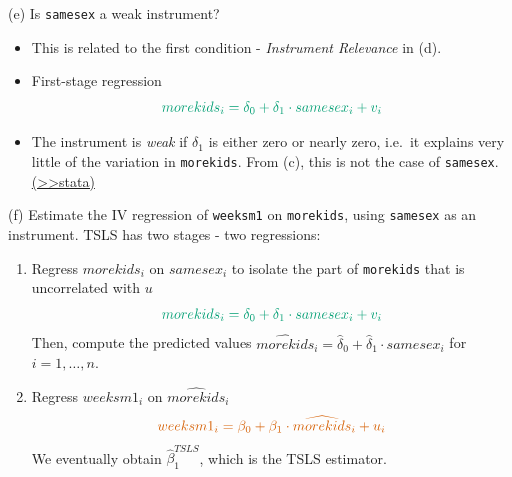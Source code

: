 \documentclass[
  10pt,
  ignorenonframetext,
]{beamer}
\begin{document}
\begin{frame}[fragile]{(e) Is \texttt{samesex} a weak instrument?}
\protect\hypertarget{e-is-samesex-a-weak-instrument}{}
\begin{itemize}
\item
  This is related to the first condition - \emph{Instrument Relevance}
  in (d).
\item
  First-stage regression \[
  \color{green}{morekids_i = \delta_0 + \delta_1 \cdot samesex_i + v_i}
  \]
\item
  The instrument is \emph{weak} if \(\delta_1\) is either zero or nearly
  zero, i.e.~it explains very little of the variation in
  \texttt{morekids}. From (c), this is not the case of \texttt{samesex}.
  \footnotesize \protect\hyperlink{res2-regFirstStage}{(\textgreater\textgreater stata)}
  \normalsize
\end{itemize}
\end{frame}

\begin{frame}[fragile]{(f) Estimate the IV regression of
\texttt{weeksm1} on \texttt{morekids}, using \texttt{samesex} as an
instrument.}
\protect\hypertarget{f-estimate-the-iv-regression-of-weeksm1-on-morekids-using-samesex-as-an-instrument.}{}
TSLS has two stages - two regressions:

\begin{enumerate}
\item
  Regress \(morekids_i\) on \(samesex_i\) to isolate the part of
  \texttt{morekids} that is uncorrelated with \(u\) \[
  \color{green}{morekids_i = \delta_0 + \delta_1 \cdot samesex_i + v_i}
  \] Then, compute the predicted values
  \(\widehat{morekids}_i = \hat\delta_0 + \hat\delta_1 \cdot samesex_i\)
  for \(i = 1,\ldots,n.\)
\item
  Regress \(weeksm1_i\) on \(\widehat{morekids}_i\) \[
  \color{red}{weeksm1_i = \beta_0 + \beta_1 \cdot \widehat{morekids}_i + u_i}
  \] We eventually obtain \(\hat{\beta}_1^{TSLS}\), which is the TSLS
  estimator.
\end{enumerate}
\end{frame}
\end{document}
